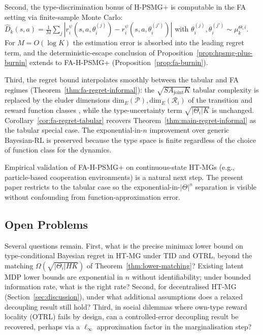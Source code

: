 \documentclass{article}
\def\textsuperscript#1{#1}%
\begin{document}
Second, the type-discrimination bonus of H-PSMG\textsuperscript{+} is computable in the FA setting via finite-sample Monte Carlo: $\widehat{D}_k(s, a) = \frac{1}{M} \sum_j |r_i^{\psi}(s, a, \theta_i^{(j)}) - r_i^{\psi}(s, a, \theta_i^{(j')})|$ with $\theta_i^{(j)}, \theta_i^{(j')} \sim \mu_k^{\Theta, i}$. For $M = O(\log K)$ the estimation error is absorbed into the leading regret term, and the deterministic-escape conclusion of Proposition~\ref{prop:hpsmg-plus-burnin} extends to FA-H-PSMG\textsuperscript{+} (Proposition~\ref{prop:fa-burnin}).

Third, the regret bound interpolates smoothly between the tabular and FA regimes (Theorem~\ref{thm:fa-regret-informal}): the $\sqrt{S A_{\mathrm{joint}} K}$ tabular complexity is replaced by the eluder dimensions $\mathrm{dim}_E(\mathcal{P}), \mathrm{dim}_E(\mathcal{R}_i)$ of the transition and reward function classes \citep{russo2014learning}, while the type-uncertainty term $\sqrt{|\Theta_i| K}$ is unchanged. Corollary~\ref{cor:fa-regret-tabular} recovers Theorem~\ref{thm:main-regret-informal} as the tabular special case. The exponential-in-$n$ improvement over generic Bayesian-RL is preserved because the type space is finite regardless of the choice of function class for the dynamics.

Empirical validation of FA-H-PSMG\textsuperscript{+} on continuous-state HT-MGs (e.g., particle-based cooperation environments) is a natural next step. The present paper restricts to the tabular case so the exponential-in-$|\Theta|^n$ separation is visible without confounding from function-approximation error.

\subsection{Open Problems}

Several questions remain. First, what is the precise minimax lower bound on type-conditional Bayesian regret in HT-MG under TID and OTRL, beyond the matching $\Omega(\sqrt{|\Theta_i| HK})$ of Theorem~\ref{thm:lower-matching}? Existing latent MDP lower bounds \citep{kwon2021rl} are exponential in $n$ without identifiability; under bounded information rate, what is the right rate? Second, for decentralised HT-MG (Section~\ref{sec:discussion}), under what additional assumptions does a relaxed decoupling result still hold? Third, in social dilemmas where own-type reward locality (OTRL) fails by design, can a controlled-error decoupling result be recovered, perhaps via a $\ell_\infty$ approximation factor in the marginalisation step?
\end{document}
